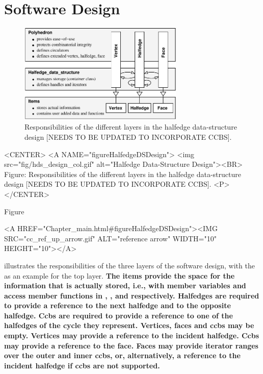 \section{Software Design}


\begin{ccTexOnly}
  \begin{figure}
    \begin{center}
      \parbox{0.7\textwidth}{%
          \includegraphics[width=0.7\textwidth]{HalfedgeDS/fig/hds_design}%
      }
    \end{center}
    \caption{Responsibilities of the different layers in the 
             halfedge data-structure design [NEEDS TO BE UPDATED TO INCORPORATE CCBS].}
    \label{figureHalfedgeDSDesign}
  \end{figure}
\end{ccTexOnly}

\begin{ccHtmlOnly}
    <CENTER>
    <A NAME="figureHalfedgeDSDesign">
        <img src="fig/hds_design_col.gif"
         alt="Halfedge Data-Structure Design"><BR>
    Figure: Responsibilities of the different layers in the 
            halfedge data-structure design [NEEDS TO BE UPDATED TO INCORPORATE CCBS].
    <P>
    </CENTER>
\end{ccHtmlOnly}

Figure~\ccTexHtml{\ref{figureHalfedgeDSDesign}}{}\begin{ccHtmlOnly}
  <A HREF="Chapter_main.html#figureHalfedgeDSDesign"><IMG 
  SRC="cc_ref_up_arrow.gif" ALT="reference arrow" WIDTH="10" HEIGHT="10"></A>
\end{ccHtmlOnly}
illustrates the responsibilities of the three layers of the software
design, with the  as an example for the top
layer.  
{\bf\ttfamily
The items provide the space for the information that is
actually stored, i.e., with member variables and access member
functions in , ,  and
 respectively. Halfedges are required to provide a reference to the
next halfedge and to the opposite halfedge. Ccbs
are required to provide a reference to one of the halfedges of the cycle
they represent.
Vertices, faces and ccbs may be empty.
Vertices may provide a reference to the incident halfedge.
Ccbs may provide a reference to the face.
Faces may provide iterator ranges over the outer and inner ccbs, or, 
alternatively, a reference to the incident halfedge if ccbs are not supported.
}

